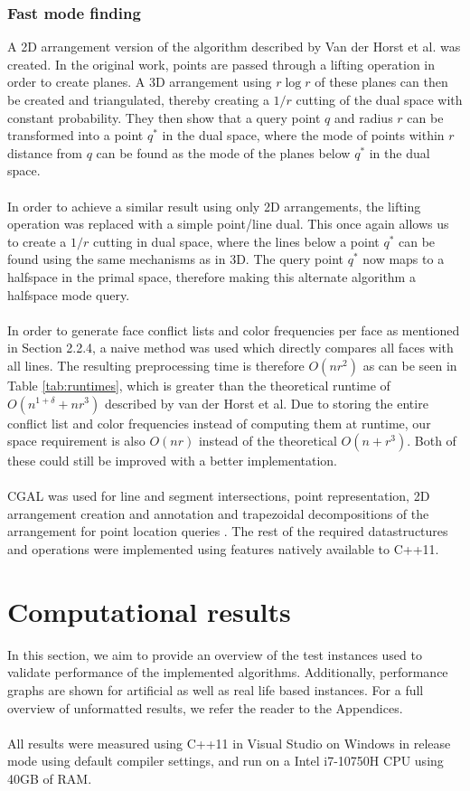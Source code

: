 \documentclass{article}
\newcommand{\fb}[1]{{#1}}
\begin{document}
\subsubsection{Fast mode finding}
A 2D arrangement version of the algorithm described by Van der Horst et al. was
created. In the original work, points are passed through a lifting operation in
order to create planes. A 3D arrangement using $r \log r$ of these planes can
then be created and triangulated, thereby creating a $1/r$ cutting of the dual
space with constant probability. They then show that a query point $q$ and
radius $r$ can be transformed into a point $q^*$ in the dual space, where the
mode of points within $r$ distance from $q$ can be found as the mode of the
planes below $q^*$ in the dual space. \\\\ In order to achieve a similar result
using only 2D arrangements, the lifting operation was replaced with a simple
point/line dual. This once again allows us to create a $1/r$ cutting in dual
space, where the lines below a point $q^*$ can be found using the same
mechanisms as in 3D. The query point $q^*$ now maps to a halfspace in the
primal space, therefore making this alternate algorithm a halfspace mode query.
\\\\ In order to generate face conflict lists and color frequencies per face as
mentioned in Section 2.2.4, a naive method was used which directly compares all
faces with all lines. The resulting preprocessing time is therefore $O(nr^2)$ as can be seen in Table \ref{tab:runtimes}, which is
greater than the theoretical runtime of \fb{$O(n^{1+\delta}+nr^3)$ described by van der Horst et al.} Due to storing
the entire conflict list and color frequencies instead of computing them at
runtime, our space requirement is also $O(nr)$ instead of the theoretical $O(n
    + r^3)$. Both of these could still be improved with a better implementation.
\\\\ CGAL was used for line and segment intersections, point representation, 2D
arrangement creation and annotation and trapezoidal decompositions of the
arrangement for point location queries \cite{cgal:foundations}
\cite{cgal:numbertypes} \cite{cgal:arrangement}. The rest of the required
datastructures and operations were implemented using features natively
available to C++11.
\section{Computational results}
In this section, we aim to provide an overview of the test instances used to
validate performance of the implemented algorithms. Additionally, performance
graphs are shown for artificial as well as real life based instances. For a
full overview of unformatted results, we refer the reader to the Appendices.
\\\\ All results were measured using C++11 in Visual Studio on Windows in
release mode using default compiler settings, and run on a Intel i7-10750H CPU
using 40GB of RAM.
\end{document}
